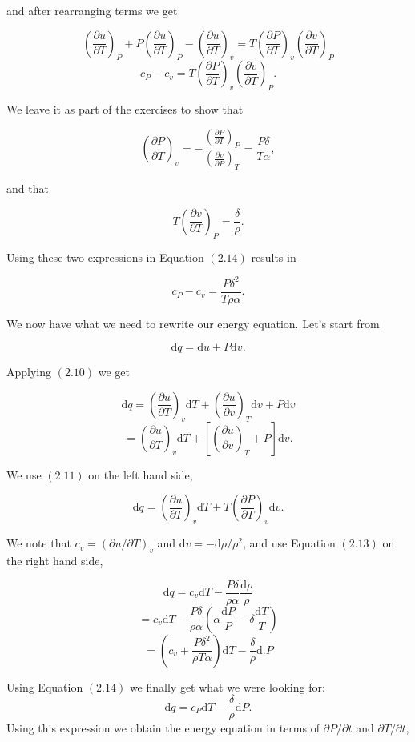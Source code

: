 \documentclass[twocolumn]{article}
\begin{document}
\begin{enumerate}
  and after rearranging terms we get

  \[\left(\frac{\partial u}{\partial T}\right)_P + P\left(\frac{\partial u}{\partial T}\right)_P-\left(\frac{\partial u}{\partial T}\right)_v = T\left(\frac{\partial P}{\partial T}\right)_v\left(\frac{\partial v}{\partial T}\right)_P\]
  \[c_P-c_v = T\left(\frac{\partial P}{\partial T}\right)_v\left(\frac{\partial v}{\partial T}\right)_P.\tag{2.12}\]

  We leave it as part of the exercises to show that

  \[\left(\frac{\partial P}{\partial T}\right)_v=-\frac{\left(\frac{\partial P}{\partial T}\right)_P}{\left(\frac{\partial v}{\partial P}\right)_T}=\frac{P\delta}{T\alpha}, \tag{2.13}\]

  and that

  \[T\left(\frac{\partial v}{\partial T}\right)_P=\frac{\delta}{\rho}.\]

  Using these two expressions in Equation \((2.14)\) results in

  \[\boxed{c_P-c_v = \frac{P\delta^2}{T\rho\alpha}}.\tag{2.14}\]
\end{enumerate}

We now have what we need to rewrite our energy equation. Let's start
from

\[\mathrm{d}q = \mathrm{d}u + P \mathrm{d}v.\]

Applying \((2.10)\) we get

\[\mathrm{d}q = \left(\frac{\partial u}{\partial T}\right)_v\mathrm{d}T + \left(\frac{\partial u}{\partial v}\right)_T\mathrm{d}v+P\mathrm{d}v\]
\[=\left(\frac{\partial u}{\partial T}\right)_v\mathrm{d}T+\left[\left(\frac{\partial u}{\partial v}\right)_T+P\right]\mathrm{d}v.\]

We use \((2.11)\) on the left hand side,

\[\mathrm{d}q=\left(\frac{\partial u}{\partial T}\right)_v\mathrm{d}T+T\left(\frac{\partial P}{\partial T}\right)_v\mathrm{d}v.\]

We note that \(c_v=(\partial u/\partial T)_v\) and
\(\mathrm{d}v=-\mathrm{d}\rho/\rho^2\), and use Equation \((2.13)\) on
the right hand side,

\[\mathrm{d}q = c_v\mathrm{d}T-\frac{P\delta}{\rho\alpha}\frac{\mathrm{d}\rho}{\rho}\]
\[=c_v\mathrm{d}T-\frac{P\delta}{\rho\alpha}\left(\alpha\frac{\mathrm{d}P}{P}-\delta\frac{\mathrm{d}T}{T}\right)\]
\[=\left(c_v+\frac{P\delta^2}{\rho T \alpha}\right)\mathrm{d}T-\frac{\delta}{\rho}\mathrm{d}.P\]

Using Equation \((2.14)\) we finally get what we were looking for:
\[\mathrm{d}q = c_P\mathrm{d}T-\frac{\delta}{\rho}\mathrm{d}P.\tag{2.15}\]
Using this expression we obtain the energy equation in terms of
\(\partial P/\partial t\) and \(\partial T/\partial t\),
\end{document}
